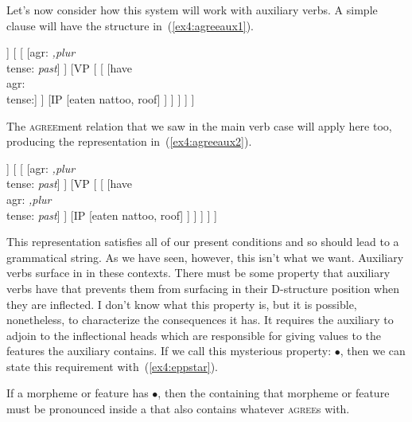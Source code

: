 Let's now consider how this system will work with auxiliary verbs. A simple clause will have the structure in~(\ref{ex4:agreeaux1}).  %
\begin{exe}
\ex \label{ex4:agreeaux1}
\small
\begin{forest}
[TP
	[DP [they, roof]]
	[ 
		[ [agr: \emph{,plur}\\ tense: \emph{past}] ]
		[VP [
			[ [have\\agr: \\tense:] ]
			[IP [eaten nattoo, roof] ]
		] ]
	]
]
\end{forest}
\end{exe}
The \textsc{agree}ment relation that we saw in the main verb case will apply here too, producing the representation in~(\ref{ex4:agreeaux2}).
\begin{exe}
\ex \label{ex4:agreeaux2}
\small
\begin{forest}
[TP
	[DP [they, roof]]
	[ 
		[ [agr: \emph{,plur}\\ tense: \emph{past}] ]
		[VP [
			[ [have\\ agr: \emph{,plur}\\ tense: \emph{past}] ]
			[IP [eaten nattoo, roof] ]
		] ]
	]
]
\end{forest}
\end{exe}
This representation satisfies all of our present conditions and so should lead to a grammatical string. As we have seen, however, this isn't what we want. Auxiliary verbs surface in  in these contexts. There must be some property that auxiliary verbs have that prevents them from surfacing in their D-structure position when they are inflected. I don't know what this property is, but it is possible, nonetheless, to characterize the consequences it has. It requires the auxiliary to adjoin to the inflectional heads which are responsible for giving values to the features the auxiliary contains. If we call this mysterious property: $\bullet$, then we can state this requirement with~(\ref{ex4:eppstar}).
\begin{exe}
\ex \label{ex4:eppstar} If a morpheme or feature has $\bullet$, then the  containing that morpheme or feature must be pronounced inside a  that also contains whatever  \textsc{agree}s with.%
%
%
%
\end{exe}
